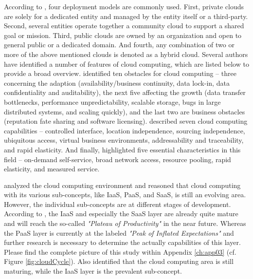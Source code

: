 According to \citet[p. 3]{Mell2011}, four deployment models are commonly used. First, private clouds are solely for a dedicated entity and managed by the entity itself or a third-party. Second, several entities operate together a community cloud to support a shared goal or mission. Third, public clouds are owned by an organization and open to general public or a dedicated domain. And fourth, any combination of two or more of the above mentioned clouds is denoted as a hybrid cloud.
Several authors have identified a number of features of cloud computing, which are listed below to provide a broad overview. \citet[pp. 54-58]{Armbrust2010} identified ten obstacles for cloud computing -- three concerning the adaption (availability/business continuity, data lock-in, data confidentiality and auditability), the next five affecting the growth (data transfer bottlenecks, performance unpredictability, scalable storage, bugs in large distributed systems, and scaling quickly), and the last two are business obstacles (reputation fate sharing and software licensing). \citet[pp. 120-127]{Iyer2010} described seven cloud computing capabilities -- controlled interface, location independence, sourcing independence, ubiquitous access, virtual business environments, addressability and traceability, and rapid elasticity. And finally, \citet[p. 2]{Mell2011} highlighted five essential characteristics in this field -- on-demand self-service, broad network access, resource pooling, rapid elasticity, and measured service. 

\citet{Smith2012} analyzed the cloud computing environment and reasoned that cloud computing with its various sub-concepts, like \ac{IaaS}, \ac{PaaS}, and \ac{SaaS}, is still an evolving area. However, the individual sub-concepts are at different stages of development. According to \citet[p. 5]{Smith2012}, the \ac{IaaS} and especially the \ac{SaaS} layer are already quite mature and will reach the so-called \textit{"Plateau of Productivity"} in the near future. Whereas the \ac{PaaS} layer is currently at the labeled \textit{"Peak of Inflated Expectations"} \citep[p. 5]{Smith2012} and further research is necessary to determine the actually capabilities of this layer. Please find the complete picture of this study within Appendix \ref{ch:app03} (cf. Figure \ref{fig:cloudCycle}). Also \citet[p. 120]{Iyer2010} identified that the cloud computing area is still maturing, while the \ac{IaaS} layer is the prevalent sub-concept.

